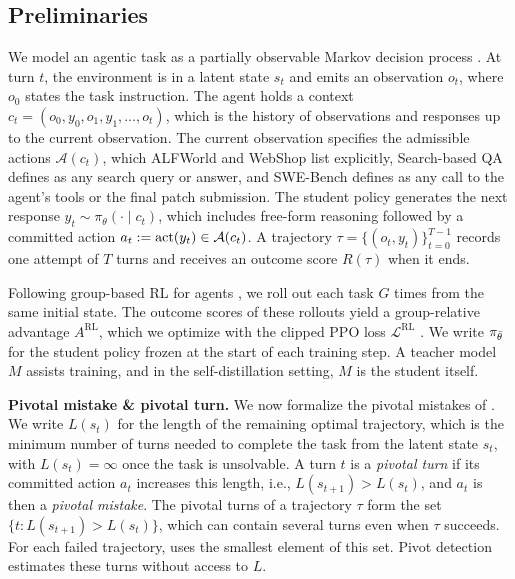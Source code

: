 \documentclass[10pt, logo, onecolumn, copyright]{nv}
\begin{document}
\subsection{Preliminaries}
\label{sec:formulation}

We model an agentic task as a partially observable Markov decision process \citep{kaelbling1998planning}. At turn $t$, the environment is in a latent state $s_t$ and emits an observation $o_t$, where $o_0$ states the task instruction. The agent holds a context $c_t = (o_0, y_0, o_1, y_1, \dots, o_t)$, which is the history of observations and responses up to the current observation. The current observation specifies the admissible actions $\mathcal{A}(c_t)$, which ALFWorld and WebShop list explicitly, Search-based QA defines as any search query or answer, and SWE-Bench defines as any call to the agent's tools or the final patch submission. The student policy generates the next response $y_t \sim \pi_\theta(\cdot \mid c_t)$, which includes free-form reasoning followed by a committed action $a_t := \operatorname{act}(y_t) \in \mathcal{A}(c_t)$. A trajectory $\tau = \{(o_t, y_t)\}_{t=0}^{T-1}$ records one attempt of $T$ turns and receives an outcome score $R(\tau)$ when it ends.

Following group-based RL for agents \citep{shao2024deepseekmath, feng2025gigpo}, we roll out each task $G$ times from the same initial state. The outcome scores of these rollouts yield a group-relative advantage $A^{\mathrm{RL}}$, which we optimize with the clipped PPO loss $\mathcal{L}^{\mathrm{RL}}$ \citep{schulman2017ppo}. We write $\pi_{\bar\theta}$ for the student policy frozen at the start of each training step. A teacher model $M$ assists training, and in the self-distillation setting, $M$ is the student itself.

\textbf{Pivotal mistake \& pivotal turn.}
We now formalize the pivotal mistakes of . We write $L(s_t)$ for the length of the remaining optimal trajectory, which is the minimum number of turns needed to complete the task from the latent state $s_t$, with $L(s_t) = \infty$ once the task is unsolvable. A turn $t$ is a \emph{pivotal turn} if its committed action $a_t$ increases this length, i.e., $L(s_{t+1}) > L(s_t)$, and $a_t$ is then a \emph{pivotal mistake}. The pivotal turns of a trajectory $\tau$ form the set $\{t : L(s_{t+1}) > L(s_t)\}$, which can contain several turns even when $\tau$ succeeds. For each failed trajectory,  uses the smallest element of this set. Pivot detection estimates these turns without access to $L$.
\end{document}
